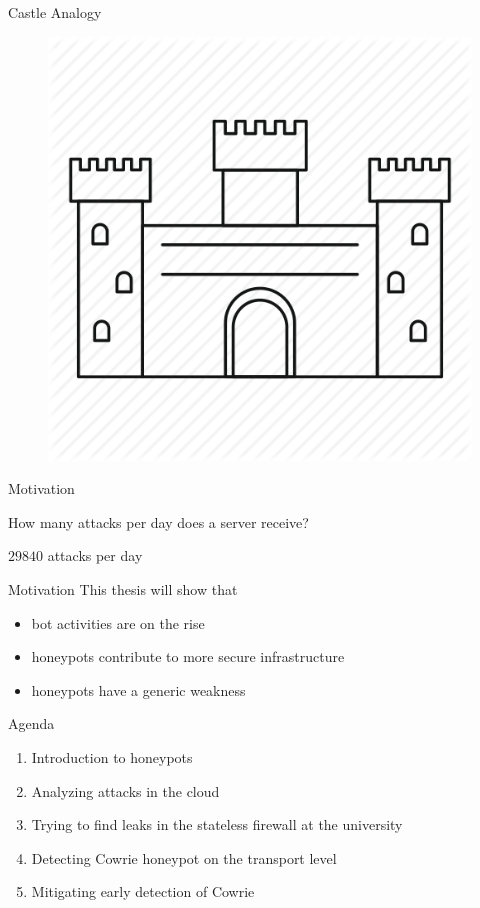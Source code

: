 \begin{frame}{Castle Analogy}
    \begin{figure}
        \centering
        \includegraphics[width=0.6\columnwidth]{img/castle.png}
    \end{figure}
\end{frame}

\begin{frame}{Motivation}
    \begin{center}
        How many attacks per day does a server receive?
    \end{center}
    \begin{center}
        $29840$ attacks per day
    \end{center}
\end{frame}

\begin{frame}{Motivation}
    This thesis will show that
    \begin{itemize}
        \item bot activities are on the rise
        \item honeypots contribute to more secure infrastructure
        \item honeypots have a generic weakness
    \end{itemize}
\end{frame}

\begin{frame}{Agenda}
    \begin{enumerate}
        \item Introduction to honeypots
        \item Analyzing attacks in the cloud
        \item Trying to find leaks in the stateless firewall at the university
        \item Detecting Cowrie honeypot on the transport level
        \item Mitigating early detection of Cowrie
    \end{enumerate}
\end{frame}
